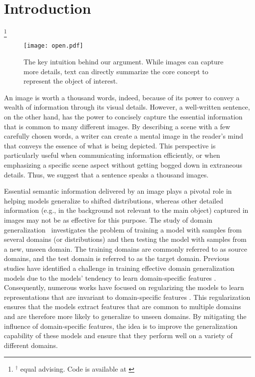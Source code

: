 \documentclass[10pt,twocolumn,letterpaper]{article}
\newcommand\blfootnote[1]{\begingroup
  \renewcommand\thefootnote{}\footnote{#1}\addtocounter{footnote}{-1}\endgroup
}
\begin{document}
\section{Introduction}
\blfootnote{$^\dagger$ equal advising. Code is available at \href{https://github.com/OoDBag/RISE}{\color{black}{github.com/OoDBag/RISE}}}
\begin{figure}
    \centering
    \texttt{[image: open.pdf]}
    \caption{The key intuition behind our argument. While images can capture more details, text can directly summarize the core concept to represent the object of interest.}
    \label{fig:open}
\end{figure}

An image is worth a thousand words, 
indeed,  because of its power to convey a wealth of information through its visual details.
However,  a well-written sentence, on the other hand, has the power to concisely capture the essential information that is common to many 
different images. 
By describing a scene with a few carefully chosen words, 
a writer can create a mental image in the reader's mind that conveys the essence of what is being depicted. This perspective is particularly useful when 
communicating information efficiently, 
or when emphasizing a specific scene aspect without getting bogged down in extraneous details.
Thus, 
we suggest that 
a sentence speaks a thousand images. 

Essential semantic information delivered by an image plays a pivotal role in helping models generalize to shifted distributions, whereas other detailed information (e.g., in the background not relevant to the main object) captured in images may not be as effective for this purpose. The study of domain generalization~\cite{muandet2013domain} investigates the problem of training a model with samples from several domains (or distributions) and then testing the model with samples from a new, unseen domain. The training domains are commonly referred to as source domains, and the test domain is referred to as the target domain. Previous studies have identified a challenge in training effective domain generalization models due to the models' tendency to learn domain-specific features \cite{geirhos2018imagenet}. Consequently, numerous works have focused on regularizing the models to learn representations that are invariant to domain-specific features \cite{li2018domain,li2018deep,zhao2020domain,wang2016select,motiian2017unified,carlucci2018agnostic,akuzawa2019adversarial,ge2021supervised,nguyen2021domain,rahman2021discriminative,han2021learning}. This regularization ensures that the models extract features that are common to multiple domains and are therefore more likely to generalize to unseen domains. By mitigating the influence of domain-specific features, the idea is to improve the generalization capability of these models and ensure that they perform well on a variety of different domains.
\end{document}
